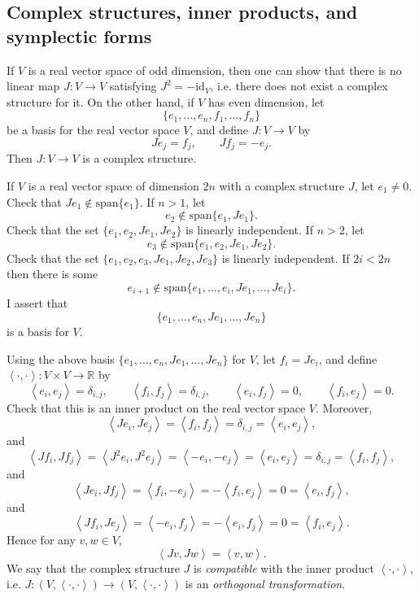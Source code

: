 \documentclass{article}
\newcommand{\inner}[2]{\left\langle #1, #2 \right\rangle}
\newcommand{\Span}{\textrm{span}}
\newcommand{\id}{\textrm{id}}
\begin{document}
\subsection{Complex structures, inner products, and symplectic forms}
If $V$ is a real vector space of odd dimension, then one can show that there is no linear map $J:V \to V$ satisfying $J^2=-\id_V$, i.e.
there does not exist a complex structure for it. On the other hand, if $V$ has even dimension,
let
\[
\{e_1,\ldots,e_n,f_1,\ldots,f_n\}
\]
be a basis for the real vector space $V$, and define $J:V \to V$ by
\[
Je_j = f_j, \qquad Jf_j=-e_j.
\]
Then $J:V \to V$ is a complex structure.

If $V$ is a real vector space of dimension $2n$ with a complex structure $J$, let $e_1 \neq 0$. Check that $J e_1 \not \in \Span\{e_1\}$. If $n > 1$, let
\[
e_2 \not \in \Span\{e_1,Je_1\}.
\]
Check that the set $\{e_1,e_2,Je_1,Je_2\}$ is linearly independent. If $n > 2$, let 
\[
e_3 \not \in \Span\{e_1,e_2,Je_1,Je_2\}.
\]
Check that the set $\{e_1,e_2,e_3,Je_1,Je_2,Je_3\}$ is linearly independent. If $2i<2n$ then there is some
\[
e_{i+1} \not \in \Span\{e_1,\ldots,e_i,Je_1,\ldots,Je_i\}.
\]
I assert that 
\[
\{e_1,\ldots,e_n,Je_1,\ldots,Je_n\}
\]
is a basis for $V$. 

Using the above basis $\{e_1,\ldots,e_n,Je_1,\ldots,Je_n\}$ for $V$, let $f_i=Je_i$, and define $\inner{\cdot}{\cdot}:V \times V \to \mathbb{R}$ by
\[
\inner{e_i}{e_j}=\delta_{i,j}, \qquad \inner{f_i}{f_j}=\delta_{i,j},\qquad \inner{e_i}{f_j}=0, \qquad
\inner{f_i}{e_j}=0.
\]
Check that this is an inner product on the real vector space $V$. Moreover, 
\[
\inner{Je_i}{Je_j}=\inner{f_i}{f_j}=\delta_{i,j}=\inner{e_i}{e_j},
\]
and
\[
\inner{Jf_i}{Jf_j}=\inner{J^2 e_i}{J^2 e_j}=\inner{-e_i}{-e_j}=\inner{e_i}{e_j}=\delta_{i,j}=\inner{f_i}{f_j},
\]
and
\[
\inner{Je_i}{Jf_j}=\inner{f_i}{-e_j}=-\inner{f_i}{e_j}=0=\inner{e_i}{f_j},
\]
and
\[
\inner{Jf_i}{Je_j}=\inner{-e_i}{f_j}=-\inner{e_i}{f_j}=0=\inner{f_i}{e_j}.
\]
Hence for any $v,w \in V$,
\[
\inner{Jv}{Jw}=\inner{v}{w}.
\]
We say that the complex structure $J$ is {\em compatible} with the inner product $\inner{\cdot}{\cdot}$, i.e.
$J:(V,\inner{\cdot}{\cdot}) \to (V,\inner{\cdot}{\cdot})$ is an {\em orthogonal transformation}.
\end{document}
